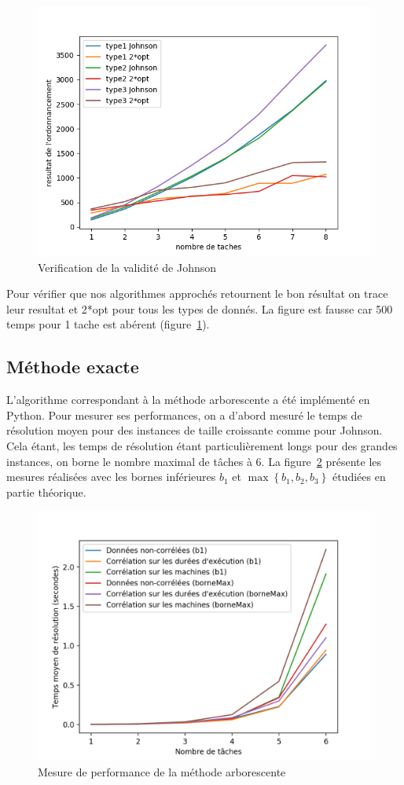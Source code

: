 \documentclass[a4paper, 10pt]{article}
\begin{document}
		
		\begin{figure}[H]
			\centering
			\includegraphics[width=0.8\linewidth]{graphes/verifValiditeJohnson.png}
			\caption{Verification de la validité de Johnson}
			\label{fig:validiteJ}
		\end{figure}
                
		
		Pour vérifier que nos algorithmes approchés retournent le bon résultat on trace leur resultat et 2*opt pour tous les types de donnés. La figure est fausse car 500 temps pour 1 tache est abérent (figure~\ref{fig:validiteJ}).
		
		\subsection*{Méthode exacte}
		
	L'algorithme correspondant à la méthode arborescente a été implémenté en Python. Pour mesurer ses performances, on a d'abord mesuré le temps de résolution moyen pour des instances de taille croissante comme pour Johnson. Cela étant, les temps de résolution étant particulièrement longs pour des grandes instances, on borne le nombre maximal de tâches à 6. La figure~\ref{fig:temps_exact} présente les mesures réalisées avec les bornes inférieures $b_1$ et $\max\left\{ b_1, b_2, b_3 \right\}$ étudiées en partie théorique.
		
		\begin{figure}[h]
			\centering
			\includegraphics[width=0.85\linewidth]{graphes/time_exact_20iter_b1bmax.png}
			\caption{Mesure de performance de la méthode arborescente}
			\label{fig:temps_exact}
		\end{figure}
		
\end{document}
